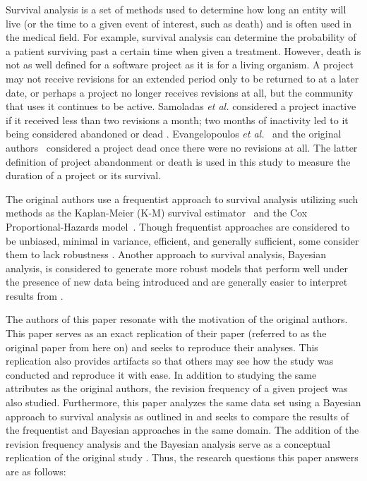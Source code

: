 \documentclass[sigconf]{acmart}
\begin{document}
Survival analysis is a set of methods used to determine how long an entity will live (or the time to a given event of interest, such as death) and is often used in the medical field.
For example, survival analysis can determine the probability of a patient surviving past a certain time when given a treatment.
However, death is not as well defined for a software project as it is for a living organism.
A project may not receive revisions for an extended period only to be returned to at a later date, or perhaps a project no longer receives revisions at all, but the community that uses it continues to be active.
Samoladas \emph{et al.} considered a project inactive if it received less than two revisions a month; two months of inactivity led to it being considered abandoned or dead \cite{samoladas2010survival}.
Evangelopoulos \emph{et al.}~\cite{evangelopoulos} and the original authors~\cite{ali2020cheating} considered a project dead once there were no revisions at all.
The latter definition of project abandonment or death is used in this study to measure the duration of a project or its survival.

The original authors use a frequentist approach to survival analysis utilizing such methods as the Kaplan-Meier (K-M) survival estimator~\cite{kaplan1958nonparametric} and the Cox Proportional-Hazards model~\cite{cox1972regression}.
Though frequentist approaches are considered to be unbiased, minimal in variance, efficient, and generally sufficient, some consider them to lack robustness \cite{renganathan2016overview}. Another approach to survival analysis, Bayesian analysis, is considered to generate more robust models that perform well under the presence of new data being introduced and are generally easier to interpret results from \cite{renganathan2016overview}.

The authors of this paper resonate with the motivation of the original authors. 
This paper serves as an exact replication \cite{shull2008role} of their paper \cite{ali2020cheating} (referred to as the original paper from here on) and seeks to reproduce their analyses. 
This replication also provides artifacts so that others may see how the study was conducted and reproduce it with ease.
In addition to studying the same attributes as the original authors, the revision frequency of a given project was also studied.
Furthermore, this paper analyzes the same data set using a Bayesian approach to survival analysis as outlined in \cite{kelter2020bayesian} and seeks to compare the results of the frequentist and Bayesian approaches in the same domain.
The addition of the revision frequency analysis and the Bayesian analysis serve as a conceptual replication \cite{shull2008role} of the original study \cite{ali2020cheating}.
Thus, the research questions this paper answers are as follows:
\end{document}
